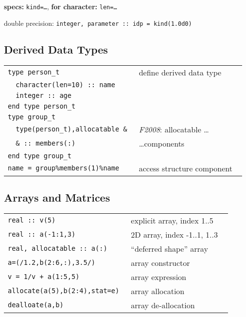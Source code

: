 \documentclass[8pt]{extarticle} %
\begin{document}
\begin{multicols}{3}
  \textbf{specs:}  {\tt kind=\dots}, \textbf{for character:} {\tt len=\dots}

  \vspace*{1ex}
  double precision: {\tt integer,~parameter~::~idp~=~kind(1.0d0)}

  \vspace*{1ex}
  \subsection{Derived Data Types}
  \begin{tabular}{L{0.55\linewidth} L{0.45\linewidth}}
  \tt type person\_t                       & define  derived data type \\
  \tt ~~character(len=10)~::~name          & \\
  \tt ~~integer~::~age                     & \\
  \tt end~type~person\_t                   & \\
  \tt type group\_t                        & \\
  \tt ~~type(person\_t),allocatable~\&     & \textit{F2008}: allocatable \dots  \\
  \tt ~~\&~::~members(:)                   & \dots components             \\
  \tt end type group\_t                    & \\
  \tt name~=~group\%members(1)\%name       & access structure component
  \end{tabular}

  \vspace*{1ex}
  \subsection{Arrays and Matrices}
  \begin{tabular}{L{0.55\linewidth} L{0.45\linewidth}}
  \tt real~::~v(5)                  & explicit array, index 1..5 \\
  \tt real~::~a(-1:1,3)             & 2D array, index -1..1, 1..3 \\
  \tt real,~allocatable~::~a(:)     & ``deferred shape'' array \\
  \tt a=(/1.2,b(2:6,:),3.5/)        & array constructor \\
  \tt v~=~1/v~+~a(1:5,5)            & array expression \\
  \tt allocate(a(5),b(2:4),stat=e)  & array allocation \\
  \tt dealloate(a,b)                & array de-allocation
  \end{tabular}


\end{multicols}
\end{document}
